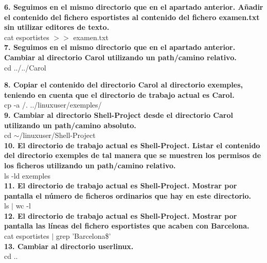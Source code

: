\documentclass[spanish]{article}
\begin{document}
\textbf{6. Seguimos en el mismo directorio que en el
apartado anterior. Añadir el contenido del fichero
esportistes al contenido del fichero examen.txt sin utilizar
editores de texto.}\\

cat esportistes \(>>\) examen.txt\\

\textbf{7. Seguimos en el mismo directorio que en el
apartado anterior. Cambiar al directorio Carol utilizando un
path/camino relativo.}\\

cd ../../Carol\\

\newpage

\textbf{8. Copiar el contenido del directorio Carol al
directorio exemples, teniendo en cuenta que el directorio de
trabajo actual es Carol.}\\

cp -a /. ../linuxuser/exemples/\\

\textbf{9. Cambiar al directorio Shell-Project desde el
directorio Carol utilizando un path/camino absoluto.}\\

cd $\sim$/linuxuser/Shell-Project\\

\textbf{10. El directorio de trabajo actual es
Shell-Project. Listar el contenido del directorio exemples
de tal manera que se muestren los permisos de los ficheros
utilizando un path/camino relativo.}\\

ls -ld exemples\\

\textbf{11. El directorio de trabajo actual es Shell-Project.
Mostrar por pantalla el número de ficheros ordinarios que
hay en este directorio.}\\

ls $\vert$ wc -l\\

\textbf{12. El directorio de trabajo actual es Shell-Project.
Mostrar por pantalla las líneas del fichero esportistes que
acaben con Barcelona.}\\

cat esportistes $\vert$ grep 'Barcelona\$'\\

\textbf{13. Cambiar al directorio userlinux.}\\

cd ..\\
\end{document}
